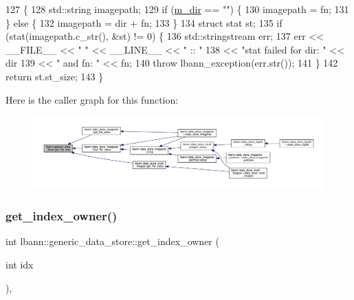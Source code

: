 \begin{DoxyCode}
127                                                                     \{
128   std::string imagepath;
129   \textcolor{keywordflow}{if} (\hyperlink{classlbann_1_1generic__data__store_ab479c127f00ce550c7433b90e40a5a3d}{m\_dir} == \textcolor{stringliteral}{""}) \{
130     imagepath = fn;
131   \} \textcolor{keywordflow}{else} \{
132     imagepath = dir + fn;
133   \}
134   \textcolor{keyword}{struct }stat st;
135   \textcolor{keywordflow}{if} (stat(imagepath.c\_str(), &st) != 0) \{
136     std::stringstream err;
137     err << \_\_FILE\_\_ << \textcolor{stringliteral}{" "} << \_\_LINE\_\_ << \textcolor{stringliteral}{" :: "}
138         << \textcolor{stringliteral}{"stat failed for dir: "} << dir
139         << \textcolor{stringliteral}{" and fn: "} << fn;
140     \textcolor{keywordflow}{throw} lbann\_exception(err.str());
141   \}
142   \textcolor{keywordflow}{return} st.st\_size;   
143 \}
\end{DoxyCode}
Here is the caller graph for this function\+:\nopagebreak
\begin{figure}[H]
\begin{center}
\leavevmode
\includegraphics[width=350pt]{classlbann_1_1generic__data__store_a7641d15eba63426acf5071acb8026442_icgraph}
\end{center}
\end{figure}
\mbox{\label{classlbann_1_1generic__data__store_ad0de5ac2cdcf3f692acb252a019a2aed}} 
\subsubsection{\texorpdfstring{get\+\_\+index\+\_\+owner()}{get\_index\_owner()}}
{\footnotesize\ttfamily int lbann\+::generic\+\_\+data\+\_\+store\+::get\+\_\+index\+\_\+owner (\begin{DoxyParamCaption}\item[{int}]{idx }\end{DoxyParamCaption})\hspace{0.3cm}{\ttfamily [inline]}, {\ttfamily [protected]}}

